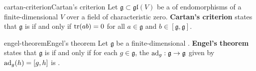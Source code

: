 \begin{topic}{cartan-criterion}{Cartan's criterion}
    Let $\mathfrak{g} \subset \mathfrak{gl}(V)$ be a  of endomorphisms of a finite-dimensional  $V$ over a field of characteristic zero. \textbf{Cartan's criterion} states that $\mathfrak{g}$ is  if and only if $\operatorname{tr}(ab) = 0$ for all $a \in \mathfrak{g}$ and $b \in [\mathfrak{g}, \mathfrak{g}]$.
\end{topic}

\begin{topic}{engel-theorem}{Engel's theorem}
    Let $\mathfrak{g}$ be a finite-dimensional . \textbf{Engel's theorem} states that $\mathfrak{g}$ is  if and only if for each $g \in \mathfrak{g}$, the  $\textup{ad}_g : \mathfrak{g} \to \mathfrak{g}$ given by $\textup{ad}_g(h) = [g, h]$ is .
\end{topic}

        
        
        
